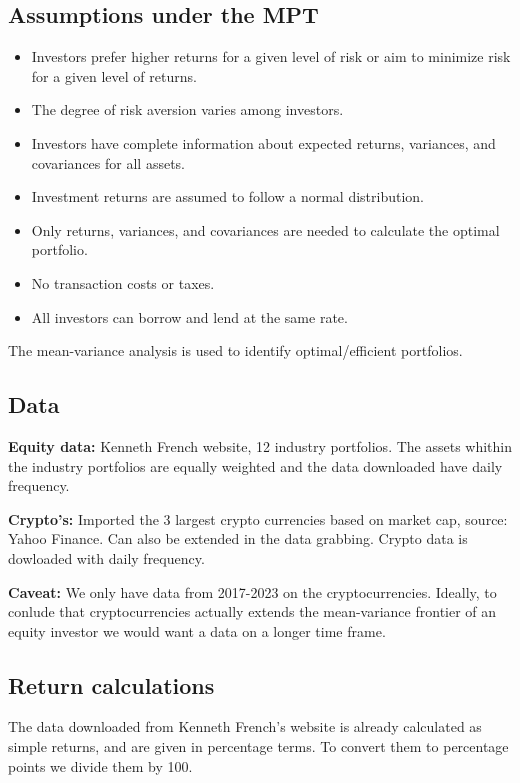 \documentclass[12pt,a4paper]{article}
\begin{document}
\subsection{Assumptions under the MPT}
\begin{itemize}
\item Investors prefer higher returns for a given level of risk or aim to minimize risk for a given level of returns.
\item The degree of risk aversion varies among investors.
\item Investors have complete information about expected returns, variances, and covariances for all assets.
\item Investment returns are assumed to follow a normal distribution.
\item Only returns, variances, and covariances are needed to calculate the optimal portfolio.
\item No transaction costs or taxes.
\item All investors can borrow and lend at the same rate. 
\end{itemize}
The mean-variance analysis is used to identify optimal/efficient portfolios.

\subsection{Data}
\textbf{Equity data:} Kenneth French website, 12 industry portfolios. The assets whithin the industry portfolios are equally 
weighted and the data downloaded have daily frequency. 

\noindent\textbf{Crypto's:} Imported the 3 largest crypto currencies based on market cap, source: Yahoo Finance. Can also be
 extended in the data grabbing. Crypto data is dowloaded with daily frequency.  

\noindent \textbf{Caveat:} We only have data from 2017-2023 on the cryptocurrencies. Ideally, to conlude that cryptocurrencies
 actually extends the mean-variance frontier of an equity investor we would want a data on a longer time frame.    

\subsection{Return calculations}
The data downloaded from Kenneth French's website is already calculated as simple returns, and are given in percentage terms. 
To convert them to percentage points we divide them by 100.  
\end{document}
